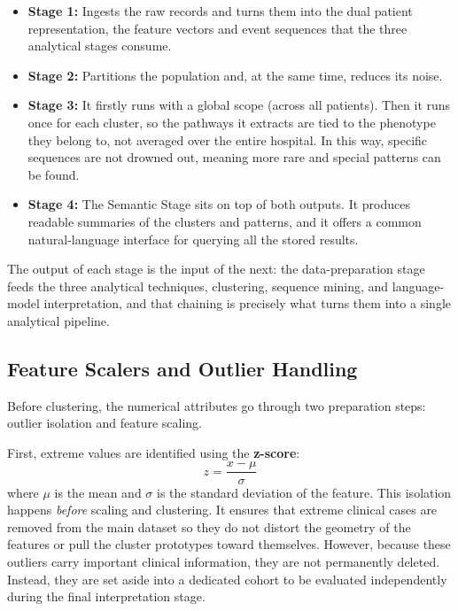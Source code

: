 \begin{itemize}
    \item \textbf{Stage 1:} Ingests the raw records and turns them into the dual patient representation, the feature vectors and event sequences that the three analytical stages consume.
    \item \textbf{Stage 2:} Partitions the population and, at the same time, reduces its noise.
    \item \textbf{Stage 3:} It firstly runs with a global scope (across all patients). Then it runs once for each cluster, so the pathways it extracts are tied to the phenotype they belong to, not averaged over the entire hospital. In this way, specific sequences are not drowned out, meaning more rare and special patterns can be found.
    \item \textbf{Stage 4:} The Semantic Stage sits on top of both outputs. It produces readable summaries of the clusters and patterns, and it offers a common natural-language interface for querying all the stored results.
\end{itemize}

The output of each stage is the input of the next: the data-preparation stage feeds the three analytical techniques, clustering, sequence mining, and language-model interpretation, and that chaining is precisely what turns them into a single analytical pipeline.

\subsection{Feature Scalers and Outlier Handling}
\label{ch:feature_scaling_theory}

Before clustering, the numerical attributes go through two preparation steps: outlier isolation and feature scaling.

First, extreme values are identified using the \textbf{z-score}:
\begin{equation}
    z = \frac{x - \mu}{\sigma}
    \label{eq:zscore}
\end{equation}
where $\mu$ is the mean and $\sigma$ is the standard deviation of the feature. This isolation happens \emph{before} scaling and clustering. It ensures that extreme clinical cases are removed from the main dataset so they do not distort the geometry of the features or pull the cluster prototypes toward themselves. However, because these outliers carry important clinical information, they are not permanently deleted. Instead, they are set aside into a dedicated cohort to be evaluated independently during the final interpretation stage.


